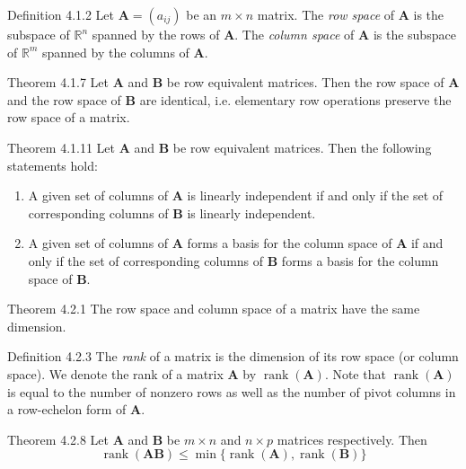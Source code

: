 \documentclass[10pt,landscape]{article}
\newcommand{\matr}[1]{\bm{#1}}
\newcommand{\rank}{\operatorname{rank}}
\theoremstyle{definition}
\newcommand{\thistheoremname}{}
\newtheorem*{genericthm*}{\thistheoremname}
\newenvironment{namedthm*}[1]
{\renewcommand{\thistheoremname}{#1}\begin{genericthm*}}
{\end{genericthm*}}
\begin{document}
\begin{multicols}{3}
\begin{namedthm*}{Definition 4.1.2}
    Let \(\matr{A} = \left(a_{ij}\right)\) be an \(m \times n\) matrix. The \textit{row space} of \(\matr{A}\) is the subspace of \(\mathbb{R}^n\) spanned by the rows of \(\matr{A}\). The \textit{column space} of \(\matr{A}\) is the subspace of \(\mathbb{R}^m\) spanned by the columns of \(\matr{A}\).
\end{namedthm*}

\begin{namedthm*}{Theorem 4.1.7}
    Let \(\matr{A}\) and \(\matr{B}\) be row equivalent matrices. Then the row space of \(\matr{A}\) and the row space of \(\matr{B}\) are identical, i.e. elementary row operations preserve the row space of a matrix.
\end{namedthm*}

\begin{namedthm*}{Theorem 4.1.11}
    Let \(\matr{A}\) and \(\matr{B}\) be row equivalent matrices. Then the following statements hold:
    \begin{enumerate}
        \item A given set of columns of \(\matr{A}\) is linearly independent if and only if the set of corresponding columns of \(\matr{B}\) is linearly independent.
        \item A given set of columns of \(\matr{A}\) forms a basis for the column space of \(\matr{A}\) if and only if the set of corresponding columns of \(\matr{B}\) forms a basis for the column space of \(\matr{B}\).
    \end{enumerate}
\end{namedthm*}

\begin{namedthm*}{Theorem 4.2.1}
    The row space and column space of a matrix have the same dimension.
\end{namedthm*}

\begin{namedthm*}{Definition 4.2.3}
    The \textit{rank} of a matrix is the dimension of its row space (or column space). We denote the rank of a matrix \(\matr{A}\) by \(\rank(\matr{A})\). Note that \(\rank(\matr{A})\) is equal to the number of nonzero rows as well as the number of pivot columns in a row-echelon form of \(\matr{A}\).
\end{namedthm*}

\begin{namedthm*}{Theorem 4.2.8}
    Let \(\matr{A}\) and \(\matr{B}\) be \(m \times n\) and \(n \times p\) matrices respectively. Then
    \[
        \rank(\matr{AB}) \le \min\{\rank(\matr{A}), \rank(\matr{B})\}
    \]
\end{namedthm*}


\end{multicols}
\end{document}
